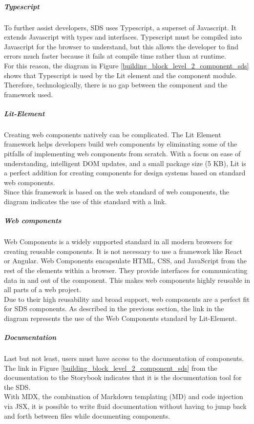 \subparagraph{Typescript}
To further assist developers, \ac{SDS} uses Typescript, a superset of Javascript. It extends Javascript with types and interfaces. Typescript must be compiled into Javascript for the browser to understand, but this allows the developer to find errors much faster because it fails at compile time rather than at runtime. \citep{microsoft_typescript_nodate} \\
For this reason, the diagram in Figure \ref{building_block_level_2_component_sds} shows that Typescript is used by the Lit element and the component module. Therefore, technologically, there is no gap between the component and the framework used.

\subparagraph{Lit-Element}
Creating web components natively can be complicated. The Lit Element framework helps developers build web components by eliminating some of the pitfalls of implementing web components from scratch. With a focus on ease of understanding, intelligent DOM updates, and a small package size (5 KB), Lit is a perfect addition for creating components for design systems based on standard web components. \citep{lit_nodate} \\
Since this framework is based on the web standard of web components, the diagram indicates the use of this standard with a link.

\subparagraph{Web components}
Web Components is a widely supported standard in all modern browsers for creating reusable components. It is not necessary to use a framework like React or Angular. Web Components encapsulate HTML, CSS, and JavaScript from the rest of the elements within a browser. They provide interfaces for communicating data in and out of the component. This makes web components highly reusable in all parts of a web project. \citep{mdn_web_component_nodate} \\
Due to their high reusability and broad support, web components are a perfect fit for \ac{SDS} components. As described in the previous section, the link in the diagram represents the use of the Web Components standard by Lit-Element.

\subparagraph{Documentation}
Last but not least, users must have access to the documentation of components. The link in Figure \ref{building_block_level_2_component_sds} from the documentation to the Storybook indicates that it is the documentation tool for the \ac{SDS}. \\
With MDX, the combination of Markdown templating (MD) and code injection via JSX, it is possible to write fluid documentation without having to jump back and forth between files while documenting components. \citep{otander_markdown_2017} \\

